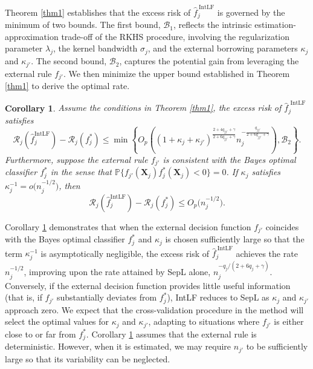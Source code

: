 \documentclass[12pt]{article}
\newtheorem{corollary}{Corollary}
\begin{document}
Theorem \ref{thm1} establishes that the excess risk of 
$\widehat{f}^{\ \mathrm{IntLF}}_j$ is governed by the minimum of two bounds. 
The first bound, $\mathcal{B}_1$, reflects the intrinsic 
estimation-approximation trade-off of the RKHS procedure, 
involving the regularization parameter $\lambda_j$, the kernel bandwidth 
$\sigma_j$, and the external borrowing parameters $\kappa_j$ and $\kappa_{j'}$.
The second bound, $\mathcal{B}_2$, captures the potential gain from leveraging 
the external rule $f_{j'}$. We then minimize the upper bound established in Theorem \ref{thm1} to derive the optimal rate.

\begin{corollary}\label{cor1}
Assume the conditions in Theorem \ref{thm1}, the excess risk of $\widehat{f}^\text{\ IntLF}_j$ satisfies
\[
\mathcal{R}_j\!\left(\widehat{f}^{\mathrm{IntLF}}_j\right) 
- \mathcal{R}_j(f_j^*) 
\leq \min\left\{O_p\left((1 + \kappa_j + \kappa_{j'})^{\frac{2 + 4q_{jj'} + \gamma}{2 + 6 q_{jj'} + \gamma}} n_j^{- \frac{q_{jj'}}{2 + 6 q_{jj'} + \gamma}}\right), \mathcal{B}_2\right\}.
\]
Furthermore, suppose the external rule $f_{j'}$ is consistent with the Bayes optimal classifier $f_j^*$ in the sense that $\mathbb{P}\bigl\{ f_{j'}(\boldsymbol X_j) f_j^*(\boldsymbol X_j) < 0 \bigr\} = 0$. If $\kappa_j$ satisfies
$\kappa_j^{-1} = o\bigl(n_j^{-1/2}\bigr)$,
then
\[
\mathcal{R}_j\!\left(\widehat{f}^{\mathrm{IntLF}}_j\right) 
- \mathcal{R}_j(f_j^*) 
\leq O_p\bigl(n_j^{-1/2}\bigr).
\]
\end{corollary}

Corollary \ref{cor1} demonstrates that when the external decision function $f_{j'}$ coincides with the Bayes optimal classifier $f_j^*$ and $\kappa_j$ is chosen sufficiently large so that the term $\kappa_j^{-1}$ is asymptotically negligible, the excess risk of $\widehat{f}^{\ \mathrm{IntLF}}_j$ achieves the rate $n_j^{-1/2}$, improving upon the rate attained by SepL alone, $n_j^{- q_j/(2 + 6 q_j + \gamma)}$. Conversely, if the external decision function provides little useful information (that is, if $f_{j'}$ substantially deviates from $f_j^*$), IntLF reduces to SepL as $\kappa_j$ and $\kappa_{j'}$ approach zero. We expect that the cross-validation procedure in the method will select the optimal values for $\kappa_j$ and $\kappa_{j'}$, adapting to situations where $f_{j'}$ is either close to or far from $f_j^*$. Corollary \ref{cor1} assumes that the external rule is deterministic. However, when it is estimated, we may require $n_{j'}$ to be sufficiently large so that its variability can be neglected.
\end{document}
